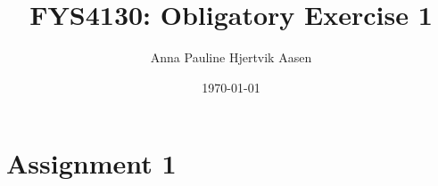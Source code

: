 \documentclass[onecolumn,english,notitlepage]{article}
\title{FYS4130: Obligatory Exercise 1}
\author{Anna Pauline Hjertvik Aasen}
\date{\today}
\begin{document}
\maketitle

\section*{Assignment 1}

\end{document}
